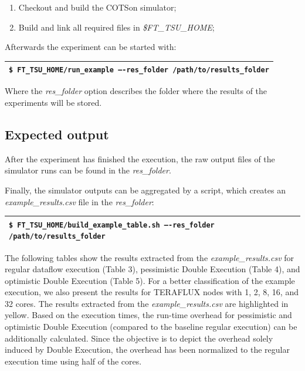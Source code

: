 \documentclass[a4paper]{article}
\newcounter{Table}
\begin{document}
\begin{enumerate}
\item {
Checkout and build the COTSon simulator;}
\item {
Build and link all required files in \textit{\$FT\_TSU\_HOME};}
\end{enumerate}
{
Afterwards the experiment can be started with:}

\begin{flushleft}
\tablehead{}
\begin{supertabular}{|m{6.29346in}|}
\hline
{} \texttt{\$ FT\_TSU\_HOME/run\_example
--{}-res\_folder /path/to/results\_folder}\\\hline
\end{supertabular}
\end{flushleft}
{
Where the \textit{res\_folder} option describes the folder where the
results of the experiments will be stored.}

\subsection[Expected output]{Expected output}
{
After the experiment has finished the execution, the raw output files of
the simulator runs can be found in the \textit{res\_folder}.}

{
Finally, the simulator outputs can be aggregated by a script, which
creates an \textit{example\_results.csv }file in the\textit{
res\_folder}:}

\begin{flushleft}
\tablehead{}
\begin{supertabular}{|m{6.29346in}|}
\hline
{} \texttt{\$
FT\_TSU\_HOME/build\_example\_table.sh --{}-res\_folder
/path/to/results\_folder}\\\hline
\end{supertabular}
\end{flushleft}
{
The following tables show the results extracted from the
\textit{example\_results.csv} for regular dataflow execution (Table 3),
pessimistic Double Execution (Table 4), and optimistic Double Execution
(Table 5). For a better classification of the example execution, we
also present the results for TERAFLUX nodes with 1, 2, 8, 16, and 32
cores. The results extracted from the \textit{example\_results.csv} are
highlighted in yellow. Based on the execution times, the run-time
overhead for pessimistic and optimistic Double Execution (compared to
the baseline regular execution) can be additionally calculated. Since
the objective is to depict the overhead solely induced by Double
Execution, the overhead has been normalized to the regular execution
time using half of the cores.}
\end{document}
